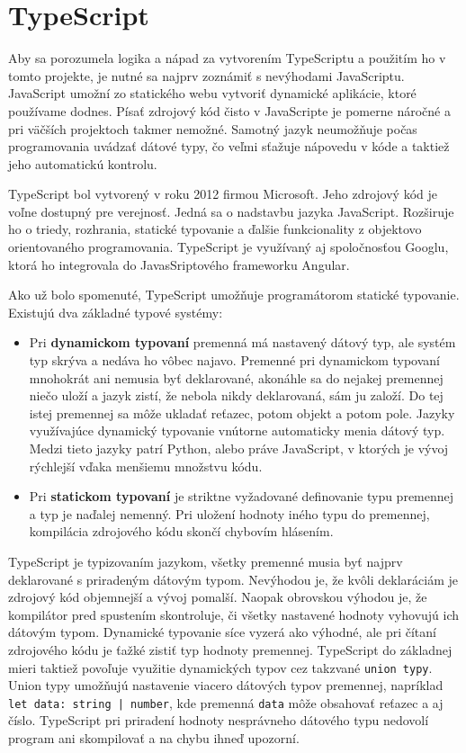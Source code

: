 \section{TypeScript}
\label{typescript}
Aby sa porozumela logika a nápad za vytvorením TypeScriptu a použitím ho v tomto projekte, je nutné sa najprv zoznámiť s nevýhodami JavaScriptu. JavaScript\cite{typescript} umožní zo statického webu vytvoriť dynamické aplikácie, ktoré používame dodnes. Písať zdrojový kód čisto v JavaScripte je pomerne náročné a pri väčších projektoch takmer nemožné. Samotný jazyk neumožňuje počas programovania uvádzať dátové typy, čo veľmi sťažuje nápovedu v kóde a taktiež jeho automatickú kontrolu.

TypeScript\cite{typescript} bol vytvorený v roku 2012 firmou Microsoft. Jeho zdrojový kód je voľne dostupný pre verejnosť. Jedná sa o nadstavbu jazyka JavaScript. Rozširuje ho o triedy, rozhrania, statické typovanie a ďalšie funkcionality z objektovo orientovaného programovania. TypeScript je využívaný aj spoločnosťou Googlu, ktorá ho integrovala do JavasSriptového frameworku Angular.

Ako už bolo spomenuté, TypeScript umožňuje programátorom statické typovanie. Existujú dva základné typové systémy:
    \begin{itemize}
        \item Pri \textbf{dynamickom typovaní} premenná má nastavený dátový typ, ale systém typ skrýva a nedáva ho vôbec najavo. Premenné pri dynamickom typovaní mnohokrát ani nemusia byť deklarované, akonáhle sa do nejakej premennej niečo uloží a jazyk zistí, že nebola nikdy deklarovaná, sám ju založí. Do tej istej premennej sa môže ukladať reťazec, potom objekt a potom pole. Jazyky využívajúce dynamický typovanie vnútorne automaticky menia dátový typ. Medzi tieto jazyky patrí Python, alebo práve JavaScript, v ktorých je vývoj rýchlejší vďaka menšiemu množstvu kódu.
        \item Pri \textbf{statickom typovaní} je striktne vyžadované definovanie typu premennej a typ je naďalej nemenný. Pri uložení hodnoty iného typu do premennej, kompilácia zdrojového kódu skončí chybovím hlásením.
    \end{itemize}
    
    TypeScript\cite{typescript} je typizovaním jazykom, všetky premenné musia byť najprv deklarované s priradeným dátovým typom. Nevýhodou je, že kvôli deklaráciám je zdrojový kód objemnejší a vývoj pomalší. Naopak obrovskou výhodou je, že kompilátor pred spustením skontroluje, či všetky nastavené hodnoty vyhovujú ich dátovým typom. Dynamické typovanie síce vyzerá ako výhodné, ale pri čítaní zdrojového kódu je ťažké zistiť typ hodnoty premennej. TypeScript do základnej mieri taktiež povoľuje využitie dynamických typov cez takzvané \texttt{union typy}. Union typy umožňujú nastavenie viacero dátových typov premennej, napríklad \texttt{let data: string | number}, kde premenná \texttt{data} môže obsahovať reťazec a aj číslo. TypeScript pri priradení hodnoty nesprávneho dátového typu nedovolí program ani skompilovať a na chybu ihneď upozorní.
    
